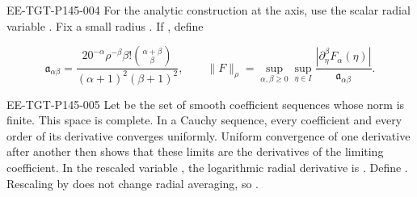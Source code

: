 \begin{EESegment}{EE-TGT-P145-004}
For the analytic construction at the axis, use the scalar radial variable
. Fix a small radius . If
, define
\end{EESegment}
\begin{equation}
  \mathfrak a_{\alpha\beta}
  =\frac{20^{-\alpha}\rho^{-\beta}\beta!\binom{\alpha+\beta}{\beta}}
         {(\alpha+1)^2(\beta+1)^2},
  \qquad
  \lVert F\rVert_\rho
  =\sup_{\alpha,\beta\geq0}\sup_{\eta\in I}
    \frac{|\partial_\eta^\beta F_\alpha(\eta)|}{\mathfrak a_{\alpha\beta}}.
  \tag{B.4}\label{eq:B.4}
\end{equation}
\begin{EESegment}{EE-TGT-P145-005}
Let  be the set of smooth coefficient sequences whose norm is
finite. This space is complete. In a Cauchy sequence, every coefficient and every order of its
derivative converges uniformly. Uniform convergence of one derivative after another then shows that
these limits are the derivatives of the limiting coefficient. In the rescaled variable
, the logarithmic radial derivative is
. Define
. Rescaling by
 does not change radial averaging, so
.
\end{EESegment}

